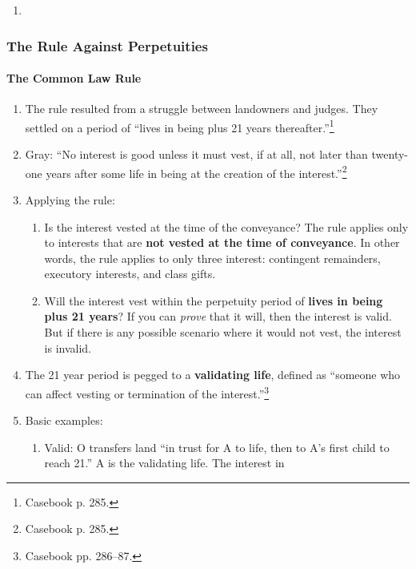 \begin{enumerate}
    \item %
\end{enumerate}

\subsubsection{The Rule Against Perpetuities}

\paragraph{The Common Law Rule}

\begin{enumerate}
    \item The rule resulted from a struggle between landowners and judges. 
    They settled on a period of ``lives in being plus 21 years 
    thereafter.''\footnote{Casebook p. 285.}
    \item Gray: ``No interest is good unless it must vest, if at all, not 
    later than twenty-one years after some life in being at the creation of 
    the interest.''\footnote{Casebook p. 285.}
    \item Applying the rule:
    \begin{enumerate}
        \item Is the interest vested at the time of the conveyance? The rule 
        applies only to interests that are \textbf{not vested at the time of 
        conveyance}. In other words, the rule applies to only three interest: 
        contingent remainders, executory interests, and class gifts.
        \item Will the interest vest within the perpetuity period of 
        \textbf{lives in being plus 21 years}? If you can \emph{prove} that it 
        will, then the interest is valid. But if there is any possible 
        scenario where it would not vest, the interest is invalid.
    \end{enumerate}
    \item The 21 year period is pegged to a \textbf{validating life}, defined 
    as ``someone who can affect vesting or termination of the 
    interest.''\footnote{Casebook pp. 286--87.}
    \item Basic examples:
    \begin{enumerate}
        \item Valid: O transfers land ``in trust for A to life, then to A's 
        first child to reach 21.'' A is the validating life. The interest in 

\end{enumerate}
\end{enumerate}
